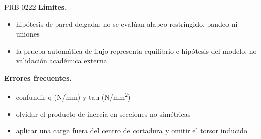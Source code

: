 \begin{studiumworked}{PRB-0222}
\textbf{Límites.}\begin{itemize}\item hipótesis de pared delgada; no se evalúan alabeo restringido, pandeo ni uniones
\item la prueba automática de flujo representa equilibrio e hipótesis del modelo, no validación académica externa\end{itemize}

\textbf{Errores frecuentes.}\begin{itemize}\item confundir q (N/mm) y tau (N/mm\textsuperscript{2})
\item olvidar el producto de inercia en secciones no simétricas
\item aplicar una carga fuera del centro de cortadura y omitir el torsor inducido\end{itemize}

\end{studiumworked}

\Needspace{.3\textheight}


